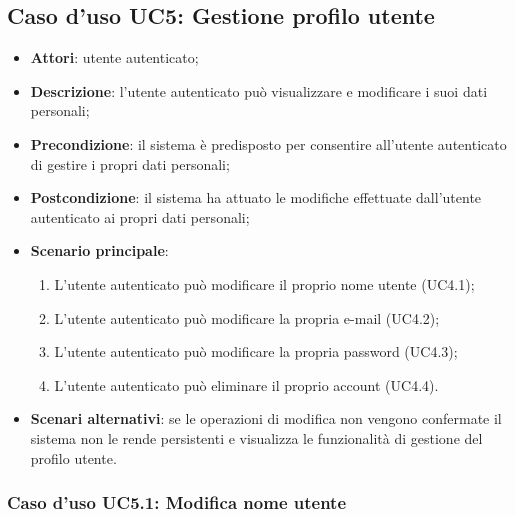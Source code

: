 \subsection{Caso d'uso UC5: Gestione profilo utente}

\begin{itemize}
	\item \textbf{Attori}: utente autenticato;
	\item \textbf{Descrizione}: l'utente autenticato può visualizzare e modificare i suoi dati personali;
	\item \textbf{Precondizione}: il sistema è predisposto per consentire all'utente autenticato di gestire i propri dati personali;
	\item \textbf{Postcondizione}: il sistema ha attuato le modifiche effettuate dall'utente autenticato ai propri dati personali;
	\item \textbf{Scenario principale}:
		\begin{enumerate}
			\item L'utente autenticato può modificare il proprio nome utente (UC4.1);
			\item L'utente autenticato può modificare la propria e-mail (UC4.2);
			\item L'utente autenticato può modificare la propria password (UC4.3);
			\item L'utente autenticato può eliminare il proprio account (UC4.4).
		\end{enumerate} 
	\item \textbf{Scenari alternativi}: se le operazioni di modifica non vengono confermate il sistema non le rende persistenti e visualizza le funzionalità di gestione del profilo utente. 
\end{itemize}

\subsubsection{Caso d'uso UC5.1: Modifica nome utente}

